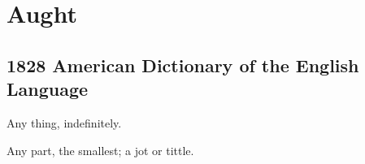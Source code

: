 \section{Aught}
	\label{AUGHT}
	

\subsection{1828 American Dictionary of the English Language} %
	\label{AUGHT-1828}

	\begin{compactitem}
		\item[1] Any thing, indefinitely.
		\item[2] Any part, the smallest; a jot or tittle.
	\end{compactitem}




	
	
